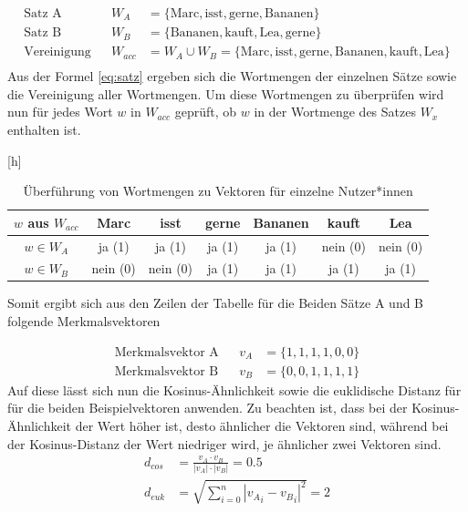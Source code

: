 \begin{equation}
	\begin{aligned} 
		\text{Satz A}&& W_{A}&=\{\text{Marc},\text{isst},\text{gerne},\text{Bananen}\}  \\
		\text{Satz B}&& W_{B}&=\{\text{Bananen},\text{kauft},\text{Lea},\text{gerne}\}  \\
		\text{Vereinigung}&& W_{acc} &= W_{A}\cup W_{B} = \{\text{Marc},\text{isst},\text{gerne},\text{Bananen},\text{kauft},\text{Lea}\}  \\
	\end{aligned} 
	\label{eq:satz}
\end{equation}
Aus der Formel \eqref{eq:satz} ergeben sich die Wortmengen der einzelnen Sätze sowie die Vereinigung aller Wortmengen. Um diese Wortmengen zu überprüfen wird nun für jedes Wort $w$ in $W_{acc}$ geprüft, ob $w$ in der Wortmenge des Satzes $W_{x}$ enthalten ist. 
\begin{center}[h]
	\begin{table}
	\begin{tabular}{c | c | c | c | c | c | c}
		
		$w$ aus $W_{acc}$ & Marc 	& isst 		& gerne 	& Bananen 	& kauft 	& Lea		\\
		\hline
		\hline
		$w\in {W}_{A}$ 	  & ja (1)	& ja (1)	& ja (1)	& ja (1)	& nein (0)	& nein (0)	\\
		\hline
		$w\in {W}_{B}$ 	  & nein (0)& nein (0)	& ja (1)	& ja (1)	& ja (1)	& ja (1)

	\end{tabular}
		\caption{Überführung von Wortmengen zu Vektoren für einzelne Nutzer*innen}
	\end{table}
\end{center}

Somit ergibt sich aus den Zeilen der Tabelle für die Beiden Sätze A und B folgende Merkmalsvektoren

\begin{equation}
	\begin{aligned} 
		\text{Merkmalsvektor A}&& v_{A}&=\{1,1,1,1,0,0\}  \\
		\text{Merkmalsvektor B}&& v_{B}&=\{0,0,1,1,1,1\}
	\end{aligned} 
\label{eq:merkmalsvektoren}
\end{equation}
Auf diese lässt sich nun die Kosinus-Ähnlichkeit sowie die euklidische Distanz für für die beiden Beispielvektoren anwenden. Zu beachten ist, dass bei der Kosinus-Ähnlichkeit der Wert höher ist, desto ähnlicher die Vektoren sind, während bei der Kosinus-Distanz der Wert niedriger wird, je ähnlicher zwei Vektoren sind. 
\begin{equation}
	\begin{aligned} 
		{d}_{cos}&=\frac{v_{A}\cdot v_{B}}{\left|v_{A}\right|\cdot \left|v_{B}\right|} = 0.5\\
		{d}_{euk}&=\sqrt{\sum _{i=0}^{n}{\left|{v_{A}}_{i}-{v_{B}}_{i}\right|}^{2}} = 2 \\  
	\end{aligned} 
	\label{eq:distance_res}
\end{equation}
